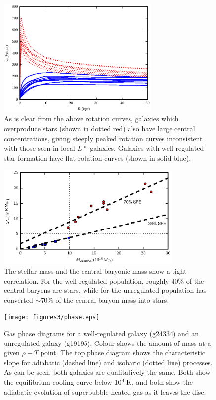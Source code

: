 \begin{figure}
    \includegraphics[width=0.7\textwidth]{figures3/rotcurve.eps}
    \caption[MUGS2 rotation curves]{As is clear from the above rotation curves,
    galaxies which overproduce stars (shown in dotted red) also have large
    central concentrations, giving steeply peaked rotation curves inconsistent
    with those seen in local $L*$ galaxies.  Galaxies with well-regulated star
    formation have flat rotation curves (shown in solid blue).}
    \label{rotation_curve}
\end{figure}
\begin{figure}
    \includegraphics[width=0.8\textwidth]{figures3/stellar_central.eps}
    \caption[Stellar mass vs. central baryonic mass in MUGS2 galaxies]{The stellar mass and the central baryonic mass show a tight
        correlation.  For the well-regulated population, roughly $40\%$ of the
        central baryons are stars, while for the unregulated population has
        converted $\sim70\%$ of the central baryon mass into stars.}
    \label{stellar_central}
\end{figure}
\begin{figure}
    \texttt{[image: figures3/phase.eps]}
    \caption[Gas phase diagram in two MUGS2 galaxies]{Gas phase diagrams for a
    well-regulated galaxy (g24334) and an unregulated galaxy (g19195).  Colour
    shows the amount of mass at a given $\rho-T$ point.  The top phase diagram
    shows the characteristic slope for adiabatic (dashed line) and isobaric
    (dotted line) processes.  As can be seen, both galaxies are qualitatively
    the same.  Both show the equilibrium cooling curve below $10^4\>{\rm K}$, and both
    show the adiabatic evolution of superbubble-heated gas as it leaves the
    disc.}
    \label{phase}
\end{figure}

